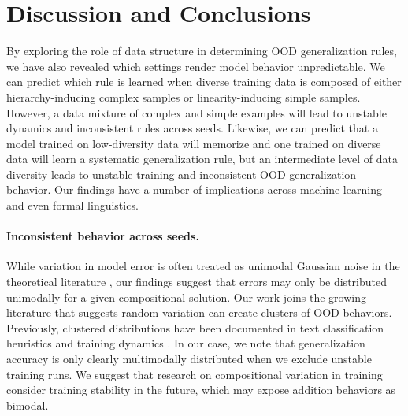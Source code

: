 \section{Discussion and Conclusions}

By exploring the role of data structure in determining OOD generalization rules, we have also revealed which settings render model behavior unpredictable. We can predict which rule is learned when diverse training data is composed of either hierarchy-inducing complex samples or linearity-inducing simple samples. However, a data mixture of complex and simple examples will lead to unstable dynamics and inconsistent rules across seeds. Likewise, we can predict that a model trained on low-diversity data will memorize and one trained on diverse data will learn a systematic generalization rule, but an intermediate level of data diversity leads to unstable training and inconsistent OOD generalization behavior. 
Our findings have a number of implications across machine learning and even formal linguistics.


\paragraph{Inconsistent behavior across seeds.} While variation in model error is often treated as unimodal Gaussian noise in the theoretical literature \citep{Lakshminarayanan2016-fb}, our findings suggest that errors may only be distributed unimodally for a given compositional solution. Our work joins the growing literature that suggests random variation can create clusters of OOD behaviors. Previously, clustered distributions have been documented in text classification heuristics \citep{Juneja2022-hj} and training dynamics \citep{Hu2023-vh}. In our case, we note that generalization accuracy is only clearly multimodally distributed when we exclude unstable training runs. We suggest that research on compositional variation in training consider training stability in the future, which may expose addition behaviors as bimodal.


